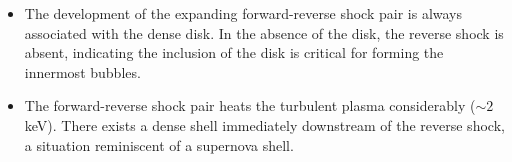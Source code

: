 \begin{itemize}


\item The development of the expanding forward-reverse shock pair is always associated with the dense disk.
In the absence of the disk, the reverse shock is absent,
indicating the inclusion of the disk is critical for forming the innermost bubbles.

\item The forward-reverse shock pair heats the turbulent plasma considerably ($\sim2$ keV).
There exists a
dense shell immediately downstream of the reverse shock, a situation reminiscent of a supernova shell.


\end{itemize}
